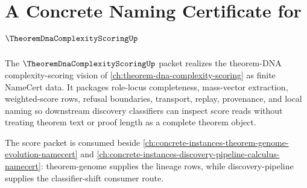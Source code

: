 \chapter{A Concrete Naming Certificate for $\TheoremDnaComplexityScoringUp$}
\label{ch:concrete-instances-theorem-dna-complexity-scoring-namecert}

The $\TheoremDnaComplexityScoringUp$ packet realizes the theorem-DNA complexity-scoring vision of \autoref{ch:theorem-dna-complexity-scoring} as finite NameCert data. It packages role-locus completeness, mass-vector extraction, weighted-score rows, refusal boundaries, transport, replay, provenance, and local naming so downstream discovery classifiers can inspect score reads without treating theorem text or proof length as a complete theorem object.

The score packet is consumed beside \autoref{ch:concrete-instances-theorem-genome-evolution-namecert} and \autoref{ch:concrete-instances-discovery-pipeline-calculus-namecert}: theorem-genome supplies the lineage rows, while discovery-pipeline supplies the classifier-shift consumer route.

